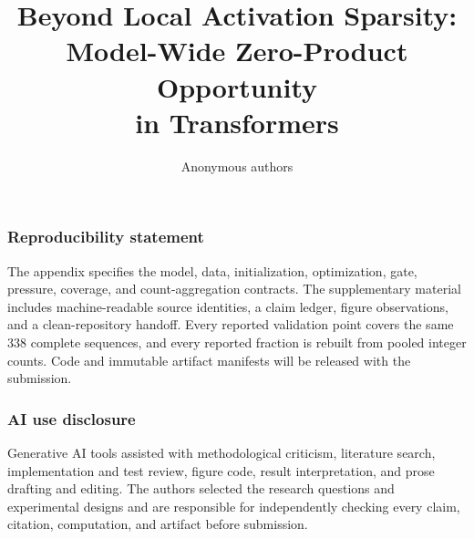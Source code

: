 \documentclass{article}
\title{Beyond Local Activation Sparsity:\\
Model-Wide Zero-Product Opportunity\\
in Transformers}
\author{Anonymous authors}
\begin{document}
\maketitle











\subsubsection*{Reproducibility statement}
The appendix specifies the model, data, initialization, optimization, gate,
pressure, coverage, and count-aggregation contracts.  The supplementary
material includes machine-readable source identities, a claim ledger, figure
observations, and a clean-repository handoff.  Every reported validation point
covers the same 338 complete sequences, and every reported fraction is rebuilt
from pooled integer counts.  Code and immutable artifact manifests will be
released with the submission.

\subsubsection*{AI use disclosure}
Generative AI tools assisted with methodological criticism, literature search,
implementation and test review, figure code, result interpretation, and prose
drafting and editing.  The authors selected the research questions and
experimental designs and are responsible for independently checking every
claim, citation, computation, and artifact before submission.




\appendix

\end{document}
